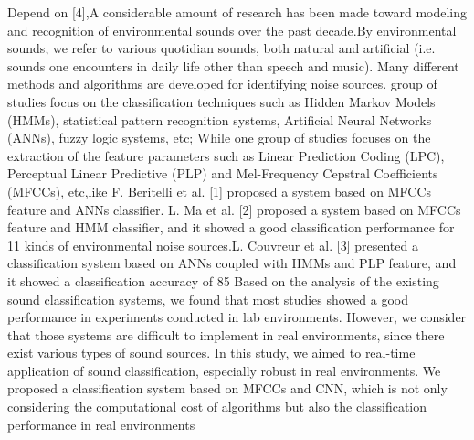 Depend on [4],A considerable amount of research has been made toward modeling and recognition of environmental sounds over
the past decade.By environmental sounds, we refer to various quotidian sounds, both natural and artificial (i.e. sounds
one encounters in daily life other than speech and music).
Many different methods and algorithms are developed for
identifying noise sources. group of studies focus on the classification techniques such as Hidden Markov Models (HMMs), statistical pattern recognition systems, Artificial Neural Networks (ANNs), fuzzy logic systems, etc; While one group of studies focuses on the extraction of the feature parameters such as Linear Prediction Coding (LPC), Perceptual Linear Predictive (PLP) and Mel-Frequency Cepstral Coefficients (MFCCs), etc,like F. Beritelli et al. [1] proposed a system  based on MFCCs feature and ANNs classifier. L. Ma et al. [2] proposed a system based on MFCCs feature and HMM classifier, and it showed a good classification performance for 11 kinds of environmental noise sources.L. Couvreur et al. [3] presented a classification system based on ANNs coupled with HMMs and PLP feature, and it showed a classification accuracy of 85%
Based on the analysis of the existing sound classification
systems, we found that most studies showed a good
performance in experiments conducted in lab environments.
However, we consider that those systems are difficult to
implement in real environments, since there exist various
types of sound sources. In this study, we aimed to real-time
application of sound classification, especially robust in real environments. We proposed a classification system based on MFCCs and CNN, which is not only considering the
computational cost of algorithms but also the classification
performance in real environments
